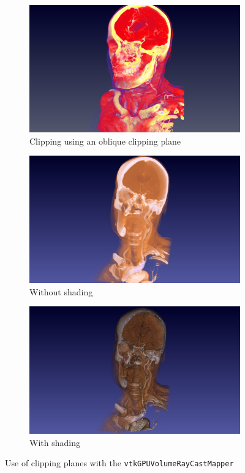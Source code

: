 \begin{figure}[htb]
  \centering
  \begin{subfigure}[b]{\columnwidth}
    \includegraphics[width=\textwidth]{HeadClippingOblique.png}
    \caption{Clipping using an oblique clipping plane}
    \label{fig:clipoblique}
  \end{subfigure}
  \begin{subfigure}[b]{.5\columnwidth}
    \includegraphics[width=\textwidth]{HeadClippingSlabNoShading.png}
    \caption{Without shading}
    \label{fig:clipnoshading}
  \end{subfigure}%
  \begin{subfigure}[b]{.5\columnwidth}
    \includegraphics[width=\textwidth]{HeadClippingSlabShading.png}
    \caption{With shading}
    \label{fig:clipshading}
  \end{subfigure}%
  \caption{Use of clipping planes with the \texttt{vtkGPUVolumeRayCastMapper}}
  \label{fig:clipping}
\end{figure}

